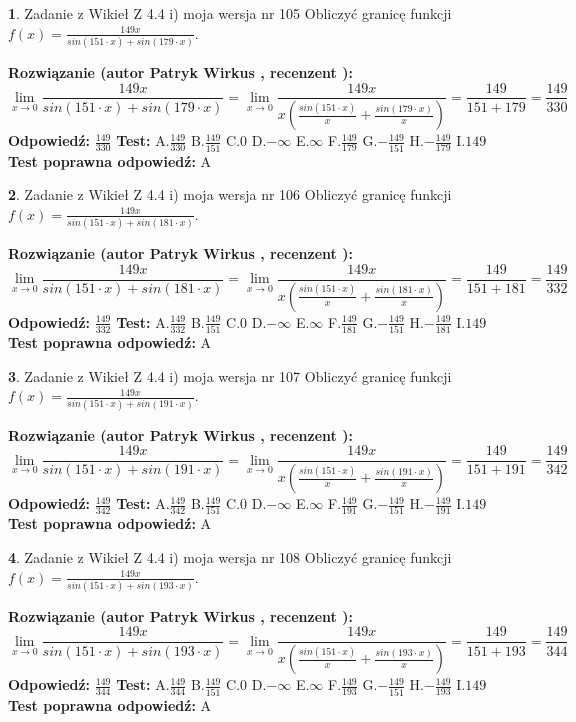 \documentclass[12pt, a4paper]{article}
\theoremstyle{definition} %
\newtheorem{zad}{}
\newcommand{\zadStart}[1]{\begin{zad}#1\newline}
\newcommand{\zadStop}{\end{zad}}
\newcommand{\rozwStart}[2]{\noindent \textbf{Rozwiązanie (autor #1 , recenzent #2): }\newline}
\newcommand{\rozwStop}{\newline}
\newcommand{\odpStart}{\noindent \textbf{Odpowiedź:}\newline}
\newcommand{\odpStop}{\newline}
\newcommand{\testStart}{\noindent \textbf{Test:}\newline}
\newcommand{\testStop}{\newline}
\newcommand{\kluczStart}{\noindent \textbf{Test poprawna odpowiedź:}\newline}
\newcommand{\kluczStop}{\newline}
\begin{document}
\zadStart{Zadanie z Wikieł Z 4.4 i) moja wersja nr 105}
Obliczyć granicę funkcji $f(x)=\frac{149x}{sin(151\cdot x) +sin(179\cdot x)}$.
\zadStop
\rozwStart{Patryk Wirkus}{}
$$\lim\limits_{x\to 0}\frac{149x}{sin(151\cdot x) +sin(179\cdot x)}=\lim\limits_{x\to 0}\frac{149x}{x(\frac{sin(151\cdot x)}{x}+\frac{sin(179\cdot x)}{x})}=\frac{149}{151+179} = \frac{149}{330}$$
\rozwStop
\odpStart
$\frac{149}{330}$
\odpStop
\testStart
A.$\frac{149}{330}$
B.$\frac{149}{151}$
C.$0$
D.$-\infty$
E.$\infty$
F.$\frac{149}{179}$
G.$-\frac{149}{151}$
H.$-\frac{149}{179}$
I.$149$
\testStop
\kluczStart
A
\kluczStop



\zadStart{Zadanie z Wikieł Z 4.4 i) moja wersja nr 106}
Obliczyć granicę funkcji $f(x)=\frac{149x}{sin(151\cdot x) +sin(181\cdot x)}$.
\zadStop
\rozwStart{Patryk Wirkus}{}
$$\lim\limits_{x\to 0}\frac{149x}{sin(151\cdot x) +sin(181\cdot x)}=\lim\limits_{x\to 0}\frac{149x}{x(\frac{sin(151\cdot x)}{x}+\frac{sin(181\cdot x)}{x})}=\frac{149}{151+181} = \frac{149}{332}$$
\rozwStop
\odpStart
$\frac{149}{332}$
\odpStop
\testStart
A.$\frac{149}{332}$
B.$\frac{149}{151}$
C.$0$
D.$-\infty$
E.$\infty$
F.$\frac{149}{181}$
G.$-\frac{149}{151}$
H.$-\frac{149}{181}$
I.$149$
\testStop
\kluczStart
A
\kluczStop



\zadStart{Zadanie z Wikieł Z 4.4 i) moja wersja nr 107}
Obliczyć granicę funkcji $f(x)=\frac{149x}{sin(151\cdot x) +sin(191\cdot x)}$.
\zadStop
\rozwStart{Patryk Wirkus}{}
$$\lim\limits_{x\to 0}\frac{149x}{sin(151\cdot x) +sin(191\cdot x)}=\lim\limits_{x\to 0}\frac{149x}{x(\frac{sin(151\cdot x)}{x}+\frac{sin(191\cdot x)}{x})}=\frac{149}{151+191} = \frac{149}{342}$$
\rozwStop
\odpStart
$\frac{149}{342}$
\odpStop
\testStart
A.$\frac{149}{342}$
B.$\frac{149}{151}$
C.$0$
D.$-\infty$
E.$\infty$
F.$\frac{149}{191}$
G.$-\frac{149}{151}$
H.$-\frac{149}{191}$
I.$149$
\testStop
\kluczStart
A
\kluczStop



\zadStart{Zadanie z Wikieł Z 4.4 i) moja wersja nr 108}
Obliczyć granicę funkcji $f(x)=\frac{149x}{sin(151\cdot x) +sin(193\cdot x)}$.
\zadStop
\rozwStart{Patryk Wirkus}{}
$$\lim\limits_{x\to 0}\frac{149x}{sin(151\cdot x) +sin(193\cdot x)}=\lim\limits_{x\to 0}\frac{149x}{x(\frac{sin(151\cdot x)}{x}+\frac{sin(193\cdot x)}{x})}=\frac{149}{151+193} = \frac{149}{344}$$
\rozwStop
\odpStart
$\frac{149}{344}$
\odpStop
\testStart
A.$\frac{149}{344}$
B.$\frac{149}{151}$
C.$0$
D.$-\infty$
E.$\infty$
F.$\frac{149}{193}$
G.$-\frac{149}{151}$
H.$-\frac{149}{193}$
I.$149$
\testStop
\kluczStart
A
\kluczStop
\end{document}
